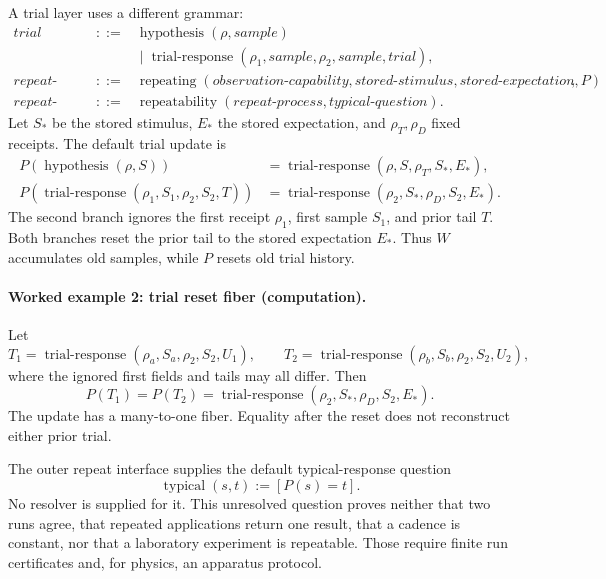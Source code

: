 A trial layer uses a different grammar:
\[
\begin{array}{rcl}
\textit{trial}&::=&\operatorname{hypothesis}(\rho,\textit{sample})\\
&&{}\mid\operatorname{trial-response}(\rho_1,\textit{sample},
                                      \rho_2,\textit{sample},\textit{trial}),\\
\textit{repeat-process}&::=&
 \operatorname{repeating}(\textit{observation-capability},
                          \textit{stored-stimulus},\textit{stored-expectation},P),\\
\textit{repeat-interface}&::=&
 \operatorname{repeatability}(\textit{repeat-process},\textit{typical-question}).
\end{array}
\]
Let \(S_*\) be the stored stimulus, \(E_*\) the stored expectation, and \(\rho_T,\rho_D\) fixed receipts.  The default
trial update is
\[
\begin{aligned}
 P(\operatorname{hypothesis}(\rho,S))
   &=\operatorname{trial-response}(\rho,S,\rho_T,S_*,E_*),\\
 P(\operatorname{trial-response}(\rho_1,S_1,\rho_2,S_2,T))
   &=\operatorname{trial-response}(\rho_2,S_*,\rho_D,S_2,E_*).
\end{aligned}
\]
The second branch ignores the first receipt \(\rho_1\), first sample \(S_1\), and prior tail \(T\).  Both branches reset
the prior tail to the stored expectation \(E_*\).  Thus \(W\) accumulates old samples, while \(P\) resets old trial
history.

\paragraph{Worked example 2: trial reset fiber (computation).}
Let
\[
 T_1=\operatorname{trial-response}(\rho_a,S_a,\rho_2,S_2,U_1),\qquad
 T_2=\operatorname{trial-response}(\rho_b,S_b,\rho_2,S_2,U_2),
\]
where the ignored first fields and tails may all differ.  Then
\[
            P(T_1)=P(T_2)=
            \operatorname{trial-response}(\rho_2,S_*,\rho_D,S_2,E_*).
\]
The update has a many-to-one fiber.  Equality after the reset does not reconstruct either prior trial.

The outer repeat interface supplies the default typical-response question
\[
                         \operatorname{typical}(s,t):=[P(s)=t].
\]
No resolver is supplied for it.  This unresolved question proves neither that two runs agree, that repeated applications return one
result, that a cadence is constant, nor that a laboratory experiment is repeatable.  Those require finite run
certificates and, for physics, an apparatus protocol.

